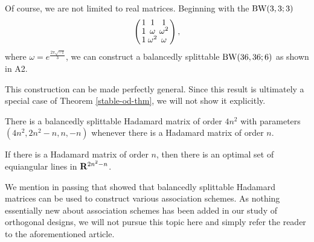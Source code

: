 \documentclass[../../../main]{subfiles}
\begin{document}
\begin{ex}
  Of course, we are not limited to real matrices. Beginning with the $\text{BW}(3,3;3)$
  \begin{equation}\label{bw3}
    \left(
      \arraycolsep=1.25pt\def\arraystretch{0.625}
      \begin{array}{ccc}
        1 & 1 & 1 \\
        1 & \omega & \omega^2 \\
        1 & \omega^2 & \omega
      \end{array}
    \right),
  \end{equation}
  where $\omega = e^\frac{2\pi\sqrt{-1}}{3}$, we can construct a balancedly
  splittable $\text{BW}(36,36;6)$ as shown in A2.
\end{ex}

This construction can be made perfectly general. Since this result is ultimately a special case of Theorem \ref{stable-od-thm}, we will not show it explicitly.

\begin{thm}\label{stable-hadamard}
 There is a balancedly splittable Hadamard matrix of order $4n^2$ with parameters $(4n^2,2n^2-n,n,-n)$ whenever there is a Hadamard matrix of order $n$.
\end{thm}

\begin{cor}\label{optimal-lines-cor}
 If there is a Hadamard matrix of order $n$, then there is an optimal set of equiangular lines in $\mathbf{R}^{2n^2-n}$.
\end{cor}
 
 We mention in passing that \cite{splittable-hadamard} showed that balancedly splittable Hadamard matrices can be used to construct various association schemes. As nothing essentially new about association schemes has been added in our study of orthogonal designs, we will not pursue this topic here and simply refer the reader to the aforementioned article.
 
\biblio
\end{document}
